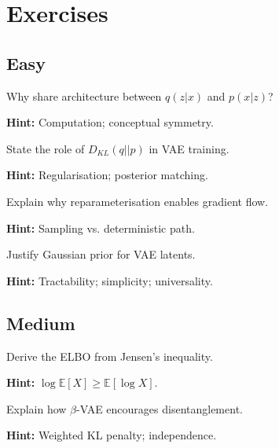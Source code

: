 
\section*{Exercises}

\subsection*{Easy}

\begin{problem}
Why share architecture between $q(z|x)$ and $p(x|z)$?

\textbf{Hint:} Computation; conceptual symmetry.
\end{problem}

\begin{problem}[KL in ELBO]
State the role of $D_{KL}(q||p)$ in VAE training.

\textbf{Hint:} Regularisation; posterior matching.
\end{problem}

\begin{problem}
Explain why reparameterisation enables gradient flow.

\textbf{Hint:} Sampling vs. deterministic path.
\end{problem}

\begin{problem}
Justify Gaussian prior for VAE latents.

\textbf{Hint:} Tractability; simplicity; universality.
\end{problem}

\subsection*{Medium}

\begin{problem}
Derive the ELBO from Jensen's inequality.

\textbf{Hint:} $\log \mathbb{E}[X] \geq \mathbb{E}[\log X]$.
\end{problem}

\begin{problem}
Explain how $\beta$-VAE encourages disentanglement.

\textbf{Hint:} Weighted KL penalty; independence.
\end{problem}

